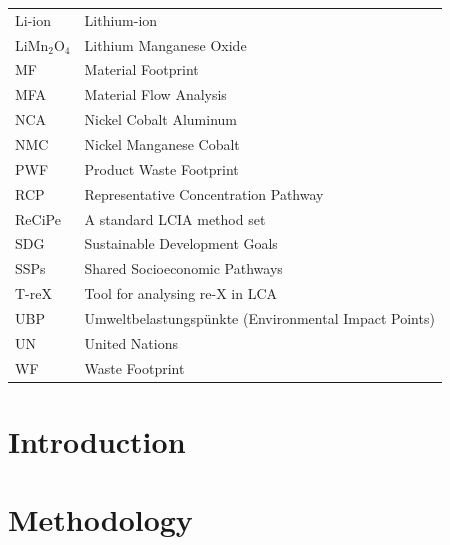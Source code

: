 \documentclass[review,3p,authoryear]{elsarticle}
\begin{document}
\begin{table}[H]
\begin{tabular}{ll}
        Li-ion            & Lithium-ion                                                         \\
        LiMn\(_2\)O\(_4\) & Lithium Manganese Oxide                                             \\
        MF                & Material Footprint                                                  \\
        MFA               & Material Flow Analysis                                              \\
        NCA               & Nickel Cobalt Aluminum                                              \\
        NMC               & Nickel Manganese Cobalt                                             \\
        PWF               & Product Waste Footprint                                             \\
        RCP               & Representative Concentration Pathway                                \\
        ReCiPe            & A standard LCIA method set                                          \\
        SDG               & Sustainable Development Goals                                       \\
        SSPs              & Shared Socioeconomic Pathways                                       \\
        T-reX             & Tool for analysing re-X in LCA                                  \\
        UBP               & Umweltbelastungspünkte (Environmental Impact Points)                \\
        UN                & United Nations                                                      \\
        WF                & Waste Footprint                                                     \\
        \bottomrule
    \end{tabular}
\end{table}

\section{Introduction}\label{sec:introduction}


\section{Methodology}\label{sec:methodology}

\end{document}
